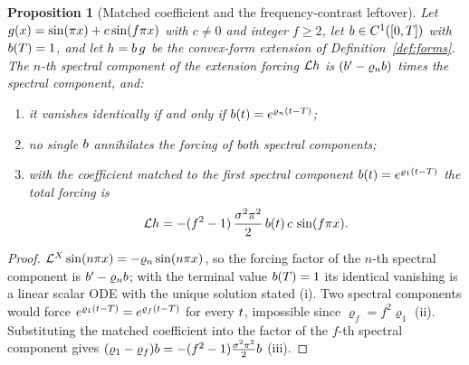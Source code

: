 \documentclass[11pt]{article}
\newcommand{\modeDecayRate}[1]{\varrho_{#1}} %
\theoremstyle{plain}
\newtheorem{proposition}[theorem]{Proposition}
\theoremstyle{definition}
\theoremstyle{remark}
\begin{document}
\begin{proposition}[Matched coefficient and the frequency-contrast leftover]\label{prop:matched}
Let $g(x)=\sin(\pi x)+c\sin(f\pi x)$ with
$c\neq0$ and integer $f\ge2$, let
$b\in C^{1}([0,T])$ with
$b(T)=1$, and let
$h=b\,g$ be the convex-form
extension of Definition~\ref{def:forms}. The $n$-th spectral component of the
extension forcing $\mathcal{L}h$ is
$(\interpolationCoefficient'-\modeDecayRate{n}\interpolationCoefficient)$ times
the spectral component, and:
\begin{enumerate}
  \item it vanishes identically if and only if
    $\interpolationCoefficient(\timePoint)=e^{\modeDecayRate{n}(\timePoint-\timeHorizon)}$;
  \item no single $b$ annihilates the forcing of both
    spectral components;
  \item with the coefficient matched to the first spectral component
    $\interpolationCoefficient(\timePoint)=e^{\modeDecayRate{1}(\timePoint-\timeHorizon)}$
    the total forcing is
    \begin{equation}\label{eq:leftover}
      \mathcal{L}h
      =-(f^{2}-1)\,\frac{\sigma^{2}\pi^{2}}{2}\,
        b(t)\,c\,\sin(f\pi x).
    \end{equation}
\end{enumerate}
\end{proposition}
\begin{proof}
$\generatorUnderlying\sin(n\pi\spacePoint)=-\modeDecayRate{n}\sin(n\pi\spacePoint)$,
so the forcing factor of the $n$-th spectral component is
$\interpolationCoefficient'-\modeDecayRate{n}\interpolationCoefficient$; with the
terminal value $b(T)=1$ its identical
vanishing is a linear scalar ODE with the unique solution stated (i). Two spectral components
would force
$e^{\modeDecayRate{1}(\timePoint-\timeHorizon)}=e^{\modeDecayRate{f}(\timePoint-\timeHorizon)}$
for every $t$, impossible since $\modeDecayRate{f}=f^{2}\modeDecayRate{1}$
(ii). Substituting the matched coefficient into the factor of the $f$-th spectral component gives
$(\modeDecayRate{1}-\modeDecayRate{f})\interpolationCoefficient
=-(f^{2}-1)\tfrac{\sigma^{2}\pi^{2}}{2}\interpolationCoefficient$ (iii).
\end{proof}
\end{document}
